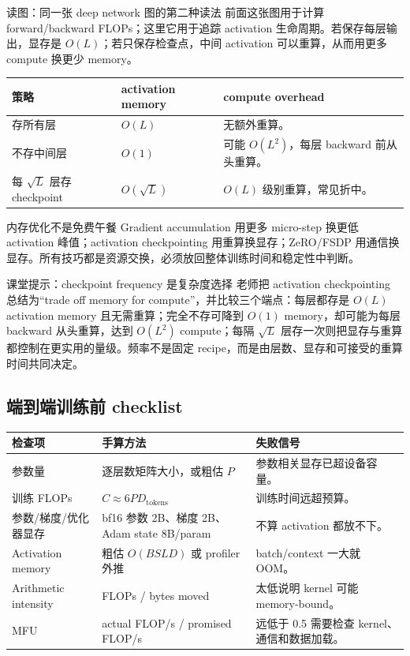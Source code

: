 \begin{knowledgebox}{读图：同一张 deep network 图的第二种读法}
前面这张图用于计算 forward/backward FLOPs；这里它用于追踪 activation 生命周期。若保存每层输出，显存是 \(O(L)\)；若只保存检查点，中间 activation 可以重算，从而用更多 compute 换更少 memory。
\end{knowledgebox}

\begin{longtable}{p{}p{}p{}}
\toprule
\textbf{策略} & \textbf{activation memory} & \textbf{compute overhead} \\
\midrule
存所有层 & \(O(L)\) & 无额外重算。 \\
不存中间层 & \(O(1)\) & 可能 \(O(L^2)\)，每层 backward 前从头重算。 \\
每 \(\sqrt L\) 层存 checkpoint & \(O(\sqrt L)\) & \(O(L)\) 级别重算，常见折中。 \\
\bottomrule
\end{longtable}

\begin{importantbox}{内存优化不是免费午餐}
Gradient accumulation 用更多 micro-step 换更低 activation 峰值；activation checkpointing 用重算换显存；ZeRO/FSDP 用通信换显存。所有技巧都是资源交换，必须放回整体训练时间和稳定性中判断。
\end{importantbox}

\begin{knowledgebox}{课堂提示：checkpoint frequency 是复杂度选择}
老师把 activation checkpointing 总结为“trade off memory for compute”，并比较三个端点：每层都存是 \(O(L)\) activation memory 且无需重算；完全不存可降到 \(O(1)\) memory，却可能为每层 backward 从头重算，达到 \(O(L^2)\) compute；每隔 \(\sqrt L\) 层存一次则把显存与重算都控制在更实用的量级。频率不是固定 recipe，而是由层数、显存和可接受的重算时间共同决定。
\end{knowledgebox}

\subsection{端到端训练前 checklist}

\begin{longtable}{p{}p{}p{}}
\toprule
\textbf{检查项} & \textbf{手算方法} & \textbf{失败信号} \\
\midrule
参数量 & 逐层数矩阵大小，或粗估 \(P\) & 参数相关显存已超设备容量。 \\
训练 FLOPs & \(C\approx 6P D_{\text{tokens}}\) & 训练时间远超预算。 \\
参数/梯度/优化器显存 & bf16 参数 2B、梯度 2B、Adam state 8B/param & 不算 activation 都放不下。 \\
Activation memory & 粗估 \(O(BSLD)\) 或 profiler 外推 & batch/context 一大就 OOM。 \\
Arithmetic intensity & FLOPs / bytes moved & 太低说明 kernel 可能 memory-bound。 \\
MFU & actual FLOP/s / promised FLOP/s & 远低于 0.5 需要检查 kernel、通信和数据加载。 \\
\bottomrule
\end{longtable}

